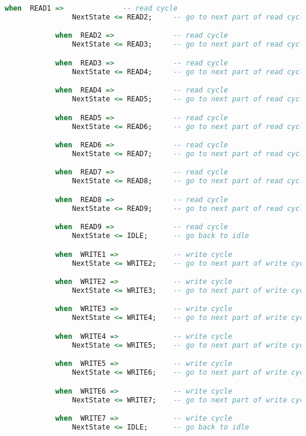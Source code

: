 \begin{lstlisting}[language=vhdl]
            when  READ1 =>              -- read cycle
                NextState <= READ2;     -- go to next part of read cycle

            when  READ2 =>              -- read cycle
                NextState <= READ3;     -- go to next part of read cycle

            when  READ3 =>              -- read cycle
                NextState <= READ4;     -- go to next part of read cycle

            when  READ4 =>              -- read cycle
                NextState <= READ5;     -- go to next part of read cycle

            when  READ5 =>              -- read cycle
                NextState <= READ6;     -- go to next part of read cycle

            when  READ6 =>              -- read cycle
                NextState <= READ7;     -- go to next part of read cycle

            when  READ7 =>              -- read cycle
                NextState <= READ8;     -- go to next part of read cycle

            when  READ8 =>              -- read cycle
                NextState <= READ9;     -- go to next part of read cycle

            when  READ9 =>              -- read cycle
                NextState <= IDLE;      -- go back to idle

            when  WRITE1 =>             -- write cycle
                NextState <= WRITE2;    -- go to next part of write cycle

            when  WRITE2 =>             -- write cycle
                NextState <= WRITE3;    -- go to next part of write cycle

            when  WRITE3 =>             -- write cycle
                NextState <= WRITE4;    -- go to next part of write cycle

            when  WRITE4 =>             -- write cycle
                NextState <= WRITE5;    -- go to next part of write cycle

            when  WRITE5 =>             -- write cycle
                NextState <= WRITE6;    -- go to next part of write cycle

            when  WRITE6 =>             -- write cycle
                NextState <= WRITE7;    -- go to next part of write cycle

            when  WRITE7 =>             -- write cycle
                NextState <= IDLE;      -- go back to idle


\end{lstlisting}
